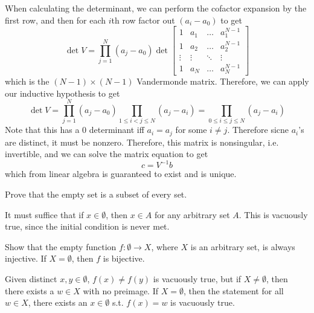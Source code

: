 \begin{solution}
    When calculating the determinant, we can perform the cofactor expansion by the first row, and then for each $i$th row factor out $(a_i - a_0)$ to get 
    \begin{equation}
      \det V = \prod_{j=1}^{N} (a_j - a_0) \det
      \begin{bmatrix}
        1 & a_1 & \ldots & a_1^{N-1} \\
        1 & a_2 & \ldots & a_2^{N-1} \\
        \vdots & \vdots & \ddots & \vdots \\
        1 & a_N & \ldots & a_N^{N-1}
      \end{bmatrix}
    \end{equation}
    which is the $(N-1) \times (N-1)$ Vandermonde matrix. Therefore, we can apply our inductive hypothesis to get 
    \begin{equation}
      \det V = \prod_{j=1}^N (a_j - a_0) \prod_{1 \leq i < j \leq N} (a_j - a_i) = \prod_{0 \leq i \leq j \leq N} (a_j - a_i)
    \end{equation}
    Note that this has a $0$ determinant iff $a_i = a_j$ for some $i \neq j$. Therefore sicne $a_i$'s are distinct, it must be nonzero. Therefore, this matrix is nonsingular, i.e. invertible, and we can solve the matrix equation to get 
    \begin{equation}
      c = V^{-1} b
    \end{equation}
    which from linear algebra is guaranteed to exist and is unique. 
  \end{solution}
  
  \begin{exercise}[Rudin 2.1]
    Prove that the empty set is a subset of every set. 
  \end{exercise}
  \begin{solution}
    It must suffice that if $x \in \emptyset$, then $x \in A$ for any arbitrary set $A$. This is vacuously true, since the initial condition is never met. 
  \end{solution}

  \begin{exercise}
    Show that the empty function $f: \emptyset \rightarrow X$, where $X$ is an arbitrary set, is always injective. If $X = \emptyset$, then $f$ is bijective. 
  \end{exercise}
  \begin{solution}
    Given distinct $x, y \in \emptyset$, $f(x) \neq f(y)$ is vacuously true, but if $X \neq \emptyset$, then there exists a $w \in X$ with no preimage. If $X = \emptyset$, then the statement for all $w \in X$, there exists an $x \in \emptyset$ s.t. $f(x) = w$ is vacuously true. 
  \end{solution}

